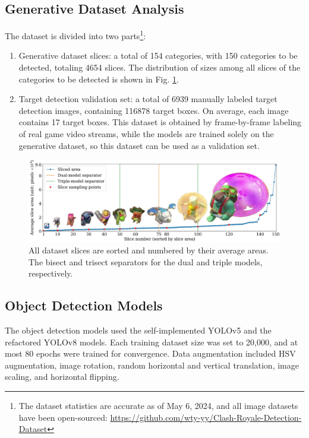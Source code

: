 \documentclass[runningheads]{llncs}
\begin{document}
\subsection{Generative Dataset Analysis}\label{sec-exp-data}
The dataset is divided into two parts\footnote{The dataset statistics are accurate as of May 6, 2024, and all image datasets have been open-sourced: \url{https://github.com/wty-yy/Clash-Royale-Detection-Dataset}}:
\begin{enumerate}
  \item Generative dataset slices: a total of 154 categories, with 150 categories to be detected, totaling 4654 slices.
  The distribution of sizes among all slices of the categories to be detected is shown in Fig. \ref{fig-segment}.
  \item Target detection validation set: a total of 6939 manually labeled target detection images,
  containing 116878 target boxes. On average, each image contains 17 target boxes.
  This dataset is obtained by frame-by-frame labeling of real game video streams,
  while the models are trained solely on the generative dataset, so this dataset can be used as a validation set.
\end{enumerate}

\begin{figure}[htbp]
  \centering
  \includegraphics[width=\textwidth]{figures/segment size.pdf}
  \caption{All dataset slices are sorted and numbered by their average areas.
  The bisect and trisect separators for the dual and triple models, respectively.}
  \label{fig-segment}
\end{figure}

\subsection{Object Detection Models}\label{sec-exp-detect}
The object detection models used the self-implemented YOLOv5 and the refactored YOLOv8 models.
Each training dataset size was set to 20,000, and at most 80 epochs were trained for convergence.
Data augmentation included HSV augmentation, image rotation, random horizontal and vertical translation,
image scaling, and horizontal flipping.
\end{document}
